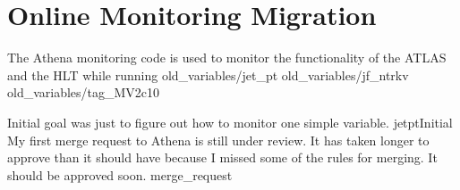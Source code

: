 \section{Online Monitoring Migration}

{ \small The Athena monitoring code is used to monitor the functionality of the ATLAS and the HLT while running }
{old_variables/jet_pt} 
{old_variables/jf_ntrkv} 
{old_variables/tag_MV2c10} 



{ Initial goal was just to figure out how to monitor one simple variable. }
{jetptInitial}
{ \small My first merge request to Athena is still under review. 
    It has taken longer to approve than it should have
    because I missed some of the rules for merging.
    It should be approved soon. }
{merge_request}

